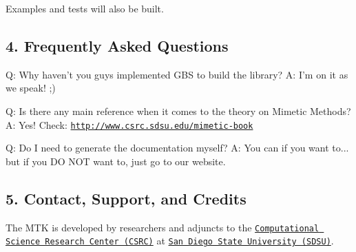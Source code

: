 \begin{DoxyPre}Examples and tests will also be built.


\end{DoxyPre}



\begin{DoxyPre}\subsection*{4. Frequently Asked Questions}\end{DoxyPre}



\begin{DoxyPre}\end{DoxyPre}



\begin{DoxyPre}Q: Why haven't you guys implemented GBS to build the library?
A: I'm on it as we speak! ;)\end{DoxyPre}



\begin{DoxyPre}Q: Is there any main reference when it comes to the theory on Mimetic Methods?
A: Yes! Check: \href{http://www.csrc.sdsu.edu/mimetic-book}{\tt http://www.csrc.sdsu.edu/mimetic-book}\end{DoxyPre}



\begin{DoxyPre}Q: Do I need to generate the documentation myself?
A: You can if you want to... but if you DO NOT want to, just go to our website.


\end{DoxyPre}



\begin{DoxyPre}\subsection*{5. Contact, Support, and Credits}\end{DoxyPre}



\begin{DoxyPre}\end{DoxyPre}



\begin{DoxyPre}The MTK is developed by researchers and adjuncts to the
\href{http://www.csrc.sdsu.edu/}{\tt Computational Science Research Center (CSRC)}
at \href{http://www.sdsu.edu/}{\tt San Diego State University (SDSU)}.\end{DoxyPre}



